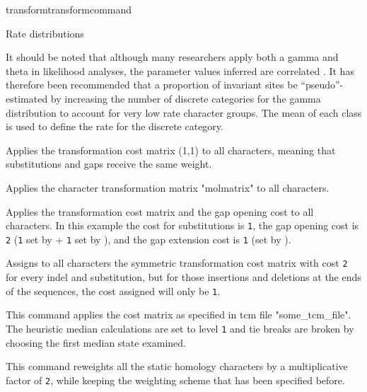 \begin{command}{transform}{transformcommand}
\begin{arguments}
\begin{argumentgroup}{Rate distributions}
\begin{statement}
It should be noted that although many researchers apply both
a gamma and theta in likelihood analyses, the parameter
values inferred are correlated \cite{sullivan1999}. It has
therefore been recommended that a proportion of invariant
sites be ``pseudo''-estimated by increasing the number of
discrete categories for the gamma distribution to account
for very low rate character groups. The mean of each class
is used to define the rate for the discrete category.
\end{statement}

\end{argumentgroup}

\end{arguments}


\begin{poyexamples} 
{Applies the transformation cost matrix (1,1) to all characters,
meaning that substitutions and gaps receive the same weight.}

{Applies the character transformation matrix "molmatrix" to all
characters.}

{Applies the transformation cost matrix and the gap opening cost
to all characters. In this example the cost for substitutions is \texttt{1},
the gap opening cost is \texttt{2} (\texttt{1} set by 
+ \texttt{1} set by ), and the gap extension cost is \texttt{1}
(set by ).}

{Assigns to all characters the symmetric transformation cost
matrix with cost \texttt{2} for every indel and substitution, but for those
insertions and deletions at the ends of the sequences, the cost
assigned will only be \texttt{1}.}

{This command applies the cost matrix as specified in tcm file 
"some\_tcm\_file". The heuristic median calculations are set to 
level \texttt{1} and tie breaks are broken
by choosing the first median state examined.}

{This command reweights all the static homology characters
by a multiplicative factor of \texttt{2}, while keeping the weighting
scheme that has been specified before.}


\end{poyexamples}
\end{command}
